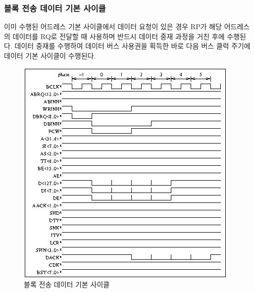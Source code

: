 \subsubsection{블록 전송 데이터 기본 사이클}
이미 수행된 어드레스 기본 사이클에서 데이터 요청이 있은 경우 RP가 해당 어드레스의 데이터를
RQ로 전달할 때 사용하며 반드시 데이터 중재 과정을 거친 후에 수행된다.
데이터 중재를 수행하여 데이터 버스 사용권을 획득한 바로 다음 버스 클럭 주기에
데이터 기본 사이클이 수행된다.
%
\begin{figure}[hp]
   \centerline{\includegraphics{ch3/FIG/block-data-basic.jpg}}
   \caption{블록 전송 데이터 기본 사이클}\label{figure:block-data-basic}
\end{figure}
